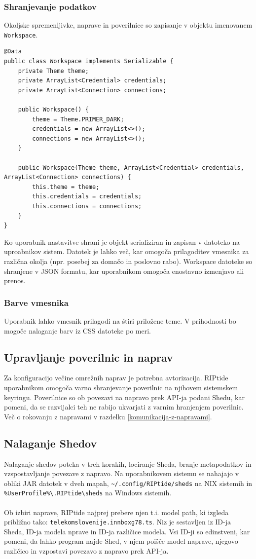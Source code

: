 \documentclass[12pt]{article}
\begin{document}
\subsubsection{Shranjevanje podatkov}
Okoljske spremenljivke, naprave in poverilnice so zapisanje v objektu
imenovanem \verb|Workspace|.

\begin{lstlisting}
@Data
public class Workspace implements Serializable {
	private Theme theme;
	private ArrayList<Credential> credentials;
	private ArrayList<Connection> connections;

	public Workspace() {
		theme = Theme.PRIMER_DARK;
		credentials = new ArrayList<>();
		connections = new ArrayList<>();
	}

	public Workspace(Theme theme, ArrayList<Credential> credentials, ArrayList<Connection> connections) {
		this.theme = theme;
		this.credentials = credentials;
		this.connections = connections;
	}
}
\end{lstlisting}
Ko uporabnik nastavitve shrani je objekt serializiran in zapisan v datoteko
na uproabnikov sistem. Datotek je lahko več, kar omogoča prilagoditev
vmesnika za različna okolja (npr. posebej za domačo in poslovno rabo).
Workspace datoteke so shranjene v JSON formatu, kar uporabnikom omogoča
enostavno izmenjavo ali prenos.

\subsubsection{Barve vmesnika}
Uporabnik lahko vmesnik prilagodi na štiri priložene teme. V prihodnosti
bo mogoče nalaganje barv iz CSS datoteke po meri.

\subsection{Upravljanje poverilnic in naprav}
Za konfiguracijo večine omrežnih naprav je potrebna avtorizacija.
RIPtide uporabnikom omogoča varno shranjevanje poverilnic na njihovem
sistemskem keyringu. Poverilnice so ob povezavi na napravo prek API-ja
podani Shedu, kar pomeni, da se razvijalci teh ne rabijo ukvarjati z
varnim hranjenjem poverilnic. Več o rokovanju z napravami v razdelku
\ref{komunikacija-z-napravami}.

\subsection{Nalaganje Shedov} \label{nalaganje-shedov}
Nalaganje shedov poteka v treh korakih, lociranje Sheda, branje
metapodatkov in vzspostavljanje povezave z napravo. Na uporabnikovem
sistemu se nahajajo v obliki JAR datotek v dveh mapah,
\verb|~/.config/RIPtide/sheds| na NIX sistemih in
\verb|%UserProfile%\.RIPtide\sheds| na Windows sistemih.
\\\\
Ob izbiri naprave, RIPtide najprej prebere njen t.i. model path, ki
izgleda približno tako: \verb|telekomslovenije.innboxg78.ts|. Niz je
sestavljen iz ID-ja Sheda, ID-ja modela nprave in ID-ja različice
modela. Vsi ID-ji so edinstveni, kar pomeni, da lahko program
najde Shed, v njem poišče model naprave, njegovo različico in
vzpostavi povezavo z napravo prek API-ja.
\newpage
\end{document}
